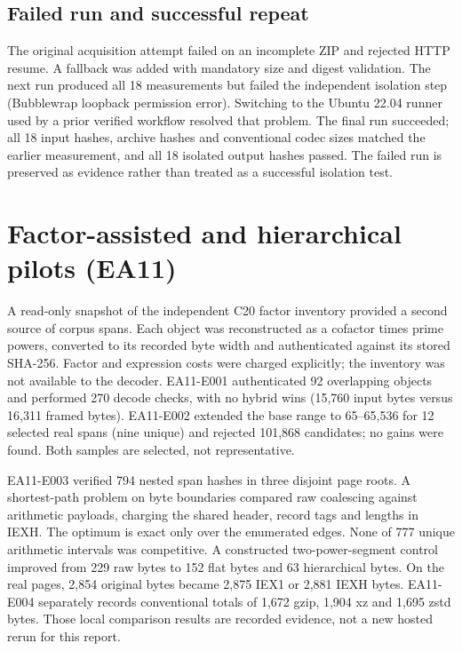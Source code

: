 \documentclass[11pt,a4paper]{article}
\begin{document}
\subsection{Failed run and successful repeat}
The original acquisition attempt failed on an incomplete ZIP and rejected HTTP resume. A fallback was added with mandatory size and digest validation. The next run produced all 18 measurements but failed the independent isolation step (Bubblewrap loopback permission error). Switching to the Ubuntu 22.04 runner used by a prior verified workflow resolved that problem. The final run succeeded; all 18 input hashes, archive hashes and conventional codec sizes matched the earlier measurement, and all 18 isolated output hashes passed. The failed run is preserved as evidence rather than treated as a successful isolation test. \cite{ea10}

\section{Factor-assisted and hierarchical pilots (EA11)}
A read-only snapshot of the independent C20 factor inventory provided a second source of corpus spans. Each object was reconstructed as a cofactor times prime powers, converted to its recorded byte width and authenticated against its stored SHA-256. Factor and expression costs were charged explicitly; the inventory was not available to the decoder. EA11-E001 authenticated 92 overlapping objects and performed 270 decode checks, with no hybrid wins (15,760 input bytes versus 16,311 framed bytes). EA11-E002 extended the base range to 65--65,536 for 12 selected real spans (nine unique) and rejected 101,868 candidates; no gains were found. Both samples are selected, not representative.

EA11-E003 verified 794 nested span hashes in three disjoint page roots. A shortest-path problem on byte boundaries compared raw coalescing against arithmetic payloads, charging the shared header, record tags and lengths in IEXH. The optimum is exact only over the enumerated edges. None of 777 unique arithmetic intervals was competitive. A constructed two-power-segment control improved from 229 raw bytes to 152 flat bytes and 63 hierarchical bytes. On the real pages, 2,854 original bytes became 2,875 IEX1 or 2,881 IEXH bytes. EA11-E004 separately records conventional totals of 1,672 gzip, 1,904 xz and 1,695 zstd bytes. Those local comparison results are recorded evidence, not a new hosted rerun for this report. \cite{ea11}
\end{document}
